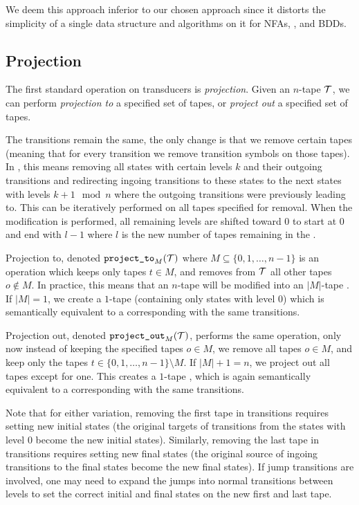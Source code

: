 We deem this approach inferior to our chosen approach since it distorts the simplicity of a single data structure and algorithms on it for NFAs, \nfts, and BDDs.

\subsection{Projection}\label{sec:projection}

The first standard operation on transducers is \emph{projection}.
Given an $n$-tape \nft $\mathcal{T}$, we can perform \emph{projection to} a specified set of tapes, or \emph{project out} a specified set of tapes.

The transitions remain the same, the only change is that we remove certain tapes (meaning that for every \nft transition we remove transition symbols on those tapes).
In \mata, this means removing all states with certain levels $k$ and their outgoing transitions and redirecting ingoing transitions to these states to the next states with levels $k + 1 \mod n$ where the outgoing transitions were previously leading to.
This can be iteratively performed on all tapes specified for removal.
When the modification is performed, all remaining levels are shifted toward $0$ to start at $0$ and end with $l - 1$ where $l$ is the new number of tapes remaining in the \nft.

Projection to, denoted $\texttt{project\_to}_{M}(\mathcal{T})$ where $M \subseteq \{ 0, 1, \ldots, n - 1 \} $ is an operation which keeps only tapes $t \in M$, and removes from $\mathcal{T}$ all other tapes $o \notin M$.
In practice, this means that an $n$-tape \nft will be modified into an $|M|$-tape \nft.
If $|M| = 1$, we create a $1$-tape \nft (containing only states with level $0$) which is semantically equivalent to a corresponding \nfa with the same transitions.

Projection out, denoted $\texttt{project\_out}_{M}(\mathcal{T})$, performs the same operation, only now instead of keeping the specified tapes $o \in M$, we remove all tapes $o \in M$, and keep only the tapes $t \in \{ 0, 1, \ldots, n - 1 \} \setminus M$.
If $|M| + 1 = n$, we project out all tapes except for one.
This creates a $1$-tape \nft, which is again semantically equivalent to a corresponding \nfa with the same transitions.

Note that for either variation, removing the first tape in \nft transitions requires setting new initial states (the original targets of transitions from the states with level $0$ become the new initial states).
Similarly, removing the last tape in \nft transitions requires setting new final states (the original source of ingoing transitions to the final states become the new final states).
If jump transitions are involved, one may need to expand the jumps into normal transitions between levels to set the correct initial and final states on the new first and last tape.

